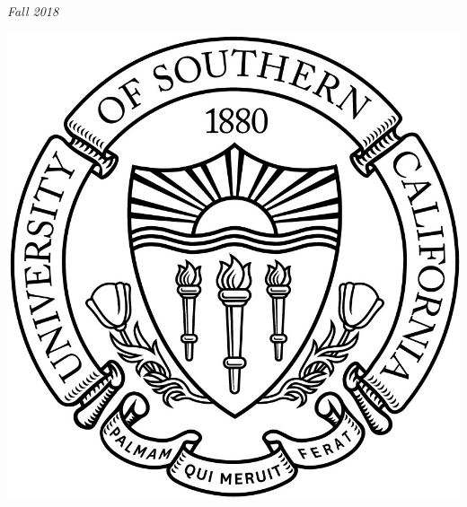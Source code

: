 \begin{titlepage}
	\vspace{0.5\baselineskip} %
	
	\textit{Fall 2018} %

	\vspace{4\baselineskip} %
	

    \includegraphics{seal}

\end{titlepage}



